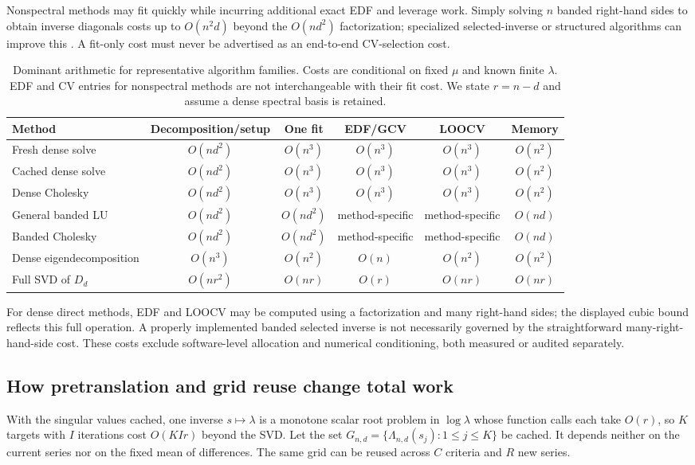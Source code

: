 Nonspectral methods may fit quickly while incurring additional exact EDF and leverage work. Simply solving $n$ banded right-hand sides to obtain inverse diagonals costs up to $O(n^2d)$ beyond the $O(nd^2)$ factorization; specialized selected-inverse or structured algorithms can improve this \citep{weinert2007,biessy2026}. A fit-only cost must never be advertised as an end-to-end CV-selection cost.

\begin{table}[t]\caption{Dominant arithmetic for representative algorithm families. Costs are conditional on fixed $\mu$ and known finite $\lambda$. EDF and CV entries for nonspectral methods are not interchangeable with their fit cost. We state $r=n-d$ and assume a dense spectral basis is retained.}\label{tab:complexity}\centering
\setlength{\tabcolsep}{4pt}
\begin{tabular}{@{}lccccc@{}}
\toprule
Method & Decomposition/setup & One fit & EDF/GCV & LOOCV & Memory\\
\midrule
Fresh dense solve & $O(nd^2)$ & $O(n^3)$ & $O(n^3)$ & $O(n^3)$ & $O(n^2)$\\
Cached dense solve & $O(nd^2)$ & $O(n^3)$ & $O(n^3)$ & $O(n^3)$ & $O(n^2)$\\
Dense Cholesky & $O(nd^2)$ & $O(n^3)$ & $O(n^3)$ & $O(n^3)$ & $O(n^2)$\\
General banded LU & $O(nd^2)$ & $O(nd^2)$ & method-specific & method-specific & $O(nd)$\\
Banded Cholesky & $O(nd^2)$ & $O(nd^2)$ & method-specific & method-specific & $O(nd)$\\
Dense eigendecomposition & $O(n^3)$ & $O(n^2)$ & $O(n)$ & $O(n^2)$ & $O(n^2)$\\
Full SVD of $D_d$ & $O(nr^2)$ & $O(nr)$ & $O(r)$ & $O(nr)$ & $O(nr)$\\
\bottomrule
\end{tabular}
\end{table}

For dense direct methods, EDF and LOOCV may be computed using a factorization and many right-hand sides; the displayed cubic bound reflects this full operation. A properly implemented banded selected inverse is not necessarily governed by the straightforward many-right-hand-side cost. These costs exclude software-level allocation and numerical conditioning, both measured or audited separately.

\subsection{How pretranslation and grid reuse change total work}
With the singular values cached, one inverse $s\mapsto\lambda$ is a monotone scalar root problem in $\log\lambda$ whose function calls each take $O(r)$, so $K$ targets with $I$ iterations cost $O(KIr)$ beyond the SVD. Let the set $G_{n,d}=\{\Lambda_{n,d}(s_j):1\le j\le K\}$ be cached. It depends neither on the current series nor on the fixed mean of differences. The same grid can be reused across $C$ criteria and $R$ new series.

